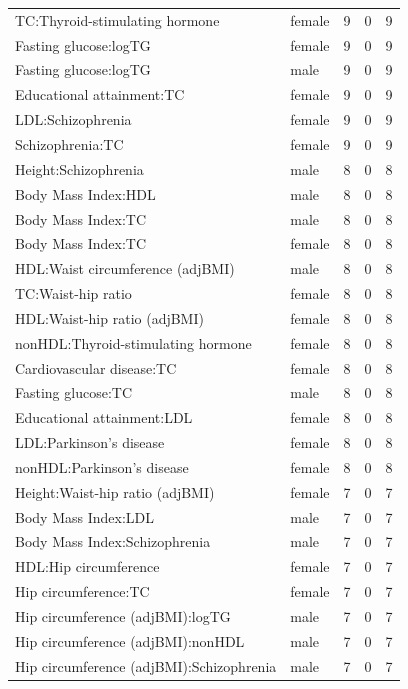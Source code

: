 \begin{table}[ht]
\begin{tabular}{llrrr}
  TC:Thyroid-stimulating hormone & female &   9 &   0 &   9 \\ 
  Fasting glucose:logTG & female &   9 &   0 &   9 \\ 
  Fasting glucose:logTG & male &   9 &   0 &   9 \\ 
  Educational attainment:TC & female &   9 &   0 &   9 \\ 
  LDL:Schizophrenia & female &   9 &   0 &   9 \\ 
  Schizophrenia:TC & female &   9 &   0 &   9 \\ 
  Height:Schizophrenia & male &   8 &   0 &   8 \\ 
  Body Mass Index:HDL & male &   8 &   0 &   8 \\ 
  Body Mass Index:TC & male &   8 &   0 &   8 \\ 
  Body Mass Index:TC & female &   8 &   0 &   8 \\ 
  HDL:Waist circumference (adjBMI) & male &   8 &   0 &   8 \\ 
  TC:Waist-hip ratio & female &   8 &   0 &   8 \\ 
  HDL:Waist-hip ratio (adjBMI) & female &   8 &   0 &   8 \\ 
  nonHDL:Thyroid-stimulating hormone & female &   8 &   0 &   8 \\ 
  Cardiovascular disease:TC & female &   8 &   0 &   8 \\ 
  Fasting glucose:TC & male &   8 &   0 &   8 \\ 
  Educational attainment:LDL & female &   8 &   0 &   8 \\ 
  LDL:Parkinson's disease & female &   8 &   0 &   8 \\ 
  nonHDL:Parkinson's disease & female &   8 &   0 &   8 \\ 
  Height:Waist-hip ratio (adjBMI) & female &   7 &   0 &   7 \\ 
  Body Mass Index:LDL & male &   7 &   0 &   7 \\ 
  Body Mass Index:Schizophrenia & male &   7 &   0 &   7 \\ 
  HDL:Hip circumference & female &   7 &   0 &   7 \\ 
  Hip circumference:TC & female &   7 &   0 &   7 \\ 
  Hip circumference (adjBMI):logTG & male &   7 &   0 &   7 \\ 
  Hip circumference (adjBMI):nonHDL & male &   7 &   0 &   7 \\ 
  Hip circumference (adjBMI):Schizophrenia & male &   7 &   0 &   7 \\ 

\end{tabular}
\end{table}

